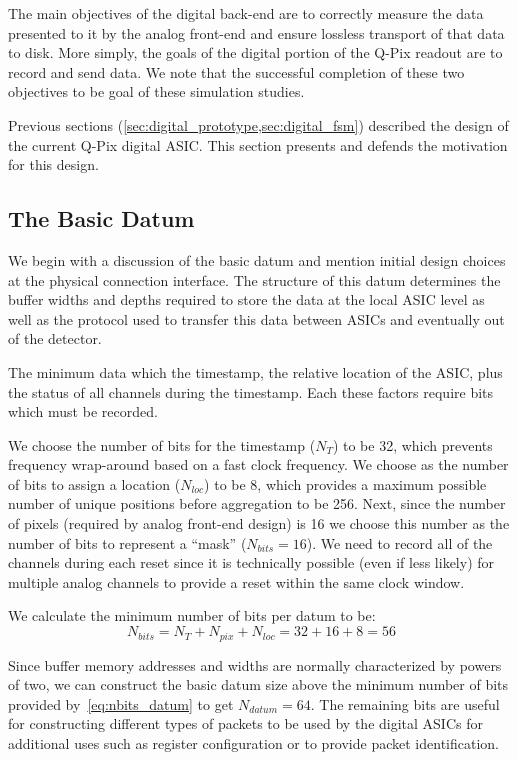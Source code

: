 The main objectives of the digital back-end are to correctly measure the data presented to it by the analog front-end and ensure lossless transport of that data to disk.
More simply, the goals of the digital portion of the Q-Pix readout are to record and send data.
We note that the successful completion of these two objectives to be goal of these simulation studies.

Previous sections (\cref{sec:digital_prototype,sec:digital_fsm}) described the design of the current Q-Pix digital ASIC.
This section presents and defends the motivation for this design.

\subsection{The Basic Datum}

We begin with a discussion of the basic datum and mention initial design choices at the physical connection interface.
The structure of this datum determines the buffer widths and depths required to store the data at the local ASIC level as well as the protocol used to transfer this data between ASICs and eventually out of the detector.

The minimum data which the timestamp, the relative location of the ASIC, plus the status of all channels during the timestamp.
Each these factors require bits which must be recorded.

We choose the number of bits for the timestamp ($N_{T}$) to be 32, which prevents frequency wrap-around based on a fast clock frequency.
We choose as the number of bits to assign a location ($N_{loc}$) to be 8, which provides a maximum possible number of unique positions before aggregation to be 256.
Next, since the number of pixels (required by analog front-end design) is 16 we choose this number as the number of bits to represent a ``mask'' ($N_{bits} = 16$).
We need to record all of the channels during each reset since it is technically possible (even if less likely) for multiple analog channels to provide a reset within the same clock window.

We calculate the minimum number of bits per datum to be:
\begin{equation}~\label{eq:nbits_datum}
  N_{bits} = N_{T} + N_{pix} + N_{loc} = 32 + 16 + 8 = 56
\end{equation}

Since buffer memory addresses and widths are normally characterized by powers of two, we can construct the basic datum size above the minimum number of bits provided by~\ref{eq:nbits_datum} to get $N_{datum} = 64$.
The remaining bits are useful for constructing different types of packets to be used by the digital ASICs for additional uses such as register configuration or to provide packet identification.

